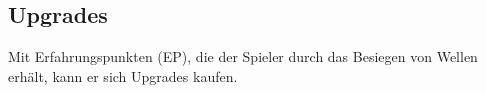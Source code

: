 \subsection{Upgrades}

%

Mit Erfahrungspunkten (EP), die der Spieler durch das Besiegen von Wellen erhält,
kann er sich Upgrades kaufen.

